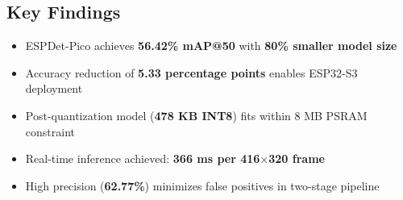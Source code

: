 \documentclass[12pt,a4paper]{article}
\begin{document}
\subsection*{Key Findings}

\begin{itemize}
    \item ESPDet-Pico achieves \textbf{56.42\% mAP@50} with \textbf{80\% smaller model size}
    \item Accuracy reduction of \textbf{5.33 percentage points} enables ESP32-S3 deployment
    \item Post-quantization model (\textbf{478 KB INT8}) fits within 8 MB PSRAM constraint
    \item Real-time inference achieved: \textbf{366 ms per 416$\times$320 frame}
    \item High precision (\textbf{62.77\%}) minimizes false positives in two-stage pipeline
\end{itemize}
\end{document}
